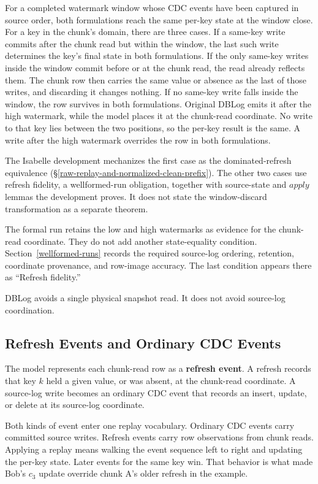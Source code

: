 \documentclass[letterpaper,10pt,twocolumn]{article}
\newcommand{\Apply}{\mathit{apply}}
\begin{document}
For a completed watermark window whose CDC events have been captured
in source order, both formulations reach the same per-key state at the
window close. For a key in the chunk's domain, there are three cases. If a
same-key write commits after the chunk read but within the window, the
last such write determines the key's final state in both formulations. If the
only same-key writes inside the window commit before or at the chunk
read, the read already reflects them. The chunk row then carries the
same value or absence as the last of those writes, and discarding it
changes nothing. If no same-key write falls inside the window, the row
survives in both formulations. Original DBLog emits it after the high
watermark, while the model places it at the chunk-read coordinate. No
write to that key lies between the two positions, so the per-key result
is the same. A write after the high watermark overrides the row in both
formulations.

The Isabelle development mechanizes the first case as the
dominated-refresh equivalence
(\S\ref{raw-replay-and-normalized-clean-prefix}). The other two cases use refresh
fidelity, a wellformed-run obligation, together with source-state and
$\Apply$ lemmas the development proves. It does not state the
window-discard transformation as a separate theorem.

The formal run retains the low and high watermarks as evidence for the
chunk-read coordinate. They do not add another state-equality
condition. Section~\ref{wellformed-runs} records the required source-log
ordering, retention, coordinate provenance, and row-image accuracy.
The last condition appears there as ``Refresh fidelity.''

DBLog avoids a single physical snapshot read. It does not avoid
source-log coordination.

\subsection{Refresh Events and Ordinary CDC
Events}\label{refresh-events-and-ordinary-cdc-events}

The model represents each chunk-read row as a \textbf{refresh event}. A refresh
records that key $k$ held a given value, or was absent, at the
chunk-read coordinate. A source-log write becomes an ordinary CDC event
that records an insert, update, or delete at its source-log coordinate.

Both kinds of event enter one replay vocabulary. Ordinary CDC events
carry committed source writes. Refresh events carry row observations
from chunk reads. Applying a replay means walking the event sequence
left to right and updating the per-key state. Later events for the same
key win. That behavior is what made Bob's $c_3$ update
override chunk A's older refresh in the example.
\end{document}
